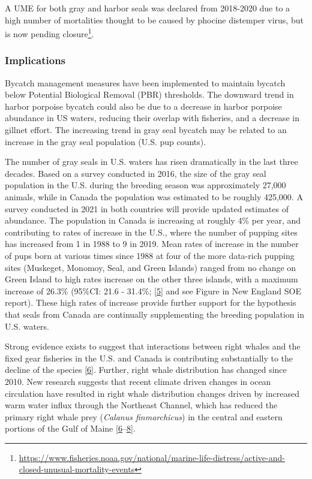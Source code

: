 \documentclass[
  10pt,
]{article}
\begin{document}
A UME for both gray and harbor seals was declared from 2018-2020 due to
a high number of mortalities thought to be caused by phocine distemper
virus, but is now pending closure\footnote{\url{https://www.fisheries.noaa.gov/national/marine-life-distress/active-and-closed-unusual-mortality-events}}.

\hypertarget{implications-5}{%
\subsubsection{Implications}\label{implications-5}}

Bycatch management measures have been implemented to maintain bycatch
below Potential Biological Removal (PBR) thresholds. The downward trend
in harbor porpoise bycatch could also be due to a decrease in harbor
porpoise abundance in US waters, reducing their overlap with fisheries,
and a decrease in gillnet effort. The increasing trend in gray seal
bycatch may be related to an increase in the gray seal population (U.S.
pup counts).

The number of gray seals in U.S. waters has risen dramatically in the
last three decades. Based on a survey conducted in 2016, the size of the
gray seal population in the U.S. during the breeding season was
approximately 27,000 animals, while in Canada the population was
estimated to be roughly 425,000. A survey conducted in 2021 in both
countries will provide updated estimates of abundance. The population in
Canada is increasing at roughly 4\% per year, and contributing to rates
of increase in the U.S., where the number of pupping sites has increased
from 1 in 1988 to 9 in 2019. Mean rates of increase in the number of
pups born at various times since 1988 at four of the more data-rich
pupping sites (Muskeget, Monomoy, Seal, and Green Islands) ranged from
no change on Green Island to high rates increase on the other three
islands, with a maximum increase of 26.3\% (95\%CI: 21.6 - 31.4\%;
{[}\protect\hyperlink{ref-wood_rates_2020}{5}{]} and see Figure in New
England SOE report). These high rates of increase provide further
support for the hypothesis that seals from Canada are continually
supplementing the breeding population in U.S. waters.

Strong evidence exists to suggest that interactions between right whales
and the fixed gear fisheries in the U.S. and Canada is contributing
substantially to the decline of the species
{[}\protect\hyperlink{ref-hayes_north_2018}{6}{]}. Further, right whale
distribution has changed since 2010. New research suggests that recent
climate driven changes in ocean circulation have resulted in right whale
distribution changes driven by increased warm water influx through the
Northeast Channel, which has reduced the primary right whale prey
(\emph{Calanus finmarchicus}) in the central and eastern portions of the
Gulf of Maine
{[}\protect\hyperlink{ref-hayes_north_2018}{6}--\protect\hyperlink{ref-sorochan_north_2019}{8}{]}.
\end{document}

